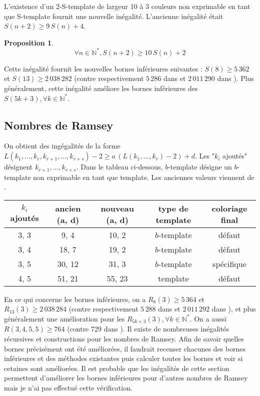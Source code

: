\documentclass{article}
\newtheorem{proposition}[definition]{Proposition}
\begin{document}
L'existence d'un 2-S-template de largeur 10 à 3 couleurs non exprimable en tant que S-template fournit une nouvelle inégalité. L'ancienne inégalité était \(S(n + 2) \geqslant 9 \, S(n) + 4\).

\begin{proposition}
	\[\forall n \in \mathbb{N}^*, S(n + 2) \geqslant 10 \, S(n) + 2\]
\end{proposition}

Cette inégalité fournit les nouvelles bornes inférieures suivantes : \(S(8) \geqslant 5\,362\) et \(S(13) \geqslant 2\,038\,282\) (contre respectivement \(5\,286\) dans \cite{RowleyRamsey} et \(2\,011\,290\) dans \cite{schurboyz}). Plus généralement, cette inégalité améliore les bornes inférieures des \(S(5 k + 3), \forall k \in \mathbb{N}^*\).

\subsection{Nombres de Ramsey}

On obtient des ingégalités de la forme \(L(k_1, ..., k_r, k_{r+1}, ..., k_{r+s}) - 2 \geqslant a \, (L(k_1, ..., k_r) - 2) + d\). Les "\(k_i\) ajoutés" désignent \( k_{r+1}, ..., k_{r+s}\). Dans le tableau ci-dessous, \(b\)-template désigne un \(b\)-template non exprimable en tant que template. Les anciennes valeurs viennent de \cite{rowleyramseysat}.
\begin{table}[H]\begin{center}
\begin{tabular}{| c | c | c | c | c |}
	\hline
	\(k_i\) ajoutés & ancien (a, d) & nouveau (a, d) & type de template & coloriage final \\
	\hline
	3, 3 & 9, 4 & 10, 2 & \(b\)-template & défaut \\
	\hline
	3, 4 & 18, 7 & 19, 2 & \(b\)-template & défaut \\
	\hline
	3, 5 & 30, 12 & 31, 3 & \(b\)-template & spécifique \\
	\hline
	4, 5 & 51, 21 & 55, 23 & template & défaut \\
	\hline
\end{tabular}
\end{center}\end{table}

En ce qui concerne les bornes inférieures, on a  \(R_8(3) \geqslant 5\,364\) et \(R_{13}(3)\geqslant 2\,038\,284\) (contre respectivement \(5\,288\) dans \cite{RowleyRamsey} et \(2\,011\,292\) dans \cite{schurboyz}), et plus généralement une amélioration pour les \(R_{5 k + 3}(3), \forall k \in \mathbb{N}^*\). On a aussi \(R(3 , 4 , 5 , 5) \geqslant 764\) (contre 729 dans \cite{rowleyramseysat}). Il existe de nombreuses inégalités récursives et constructions pour les nombres de Ramsey. Afin de savoir quelles bornes précisément ont été améliorées, il faudrait recenser chacunes des bornes inférieures et des méthodes existantes puis calculer toutes les bornes et voir si cetaines sont améliorées. Il est probable que les inégalités de cette section permettent d'améliorer les bornes inférieures pour d'autres nombres de Ramsey mais je n'ai pas effectué cette vérification.



\end{document}
